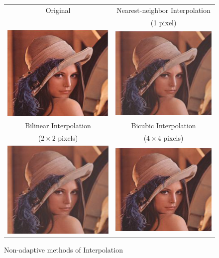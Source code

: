 \begin{figure}[t]
\centering
{\sffamily
\begin{tabular}{cc}
Original & Nearest-neighbor Interpolation \\
 & (1 pixel) \\
\includegraphics[width=.4\linewidth]{img/preprocessing/interp_orig.png}
&
\includegraphics[width=.4\linewidth]{img/preprocessing/interp_nn.png}
\vspace{1em} \\
Bilinear Interpolation & Bicubic Interpolation \\
($2\times2$ pixels) & ($4\times4$ pixels) \\
\includegraphics[width=.4\linewidth]{img/preprocessing/interp_bili.png}
&
\includegraphics[width=.4\linewidth]{img/preprocessing/interp_bicubic.png}
\end{tabular}
}
\caption{Non-adaptive methods of Interpolation}
\label{fig:preprocessInterpolation}
\end{figure}

